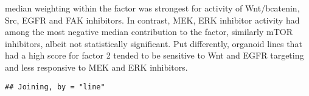 \documentclass[
]{article}
\newenvironment{Shaded}{\begin{snugshade}}{\end{snugshade}}
\newcommand{\DataTypeTok}[1]{\textcolor[rgb]{0.13,0.29,0.53}{#1}}
\newcommand{\DecValTok}[1]{\textcolor[rgb]{0.00,0.00,0.81}{#1}}
\newcommand{\KeywordTok}[1]{\textcolor[rgb]{0.13,0.29,0.53}{\textbf{#1}}}
\newcommand{\NormalTok}[1]{#1}
\newcommand{\OperatorTok}[1]{\textcolor[rgb]{0.81,0.36,0.00}{\textbf{#1}}}
\newcommand{\OtherTok}[1]{\textcolor[rgb]{0.56,0.35,0.01}{#1}}
\newcommand{\StringTok}[1]{\textcolor[rgb]{0.31,0.60,0.02}{#1}}
\begin{document}
median weighting within the factor was strongest for activity of
Wnt/bcatenin, Src, EGFR and FAK inhibitors. In contrast, MEK, ERK
inhibitor activity had among the most negative median contribution to
the factor, similarly mTOR inhibitors, albeit not statistically
significant. Put differently, organoid lines that had a high score for
factor 2 tended to be sensitive to Wnt and EGFR targeting and less
responsive to MEK and ERK inhibitors.

\begin{Shaded}
\end{Shaded}

\begin{verbatim}
## Joining, by = "line"
\end{verbatim}

\begin{Shaded}
\end{Shaded}
\end{document}
